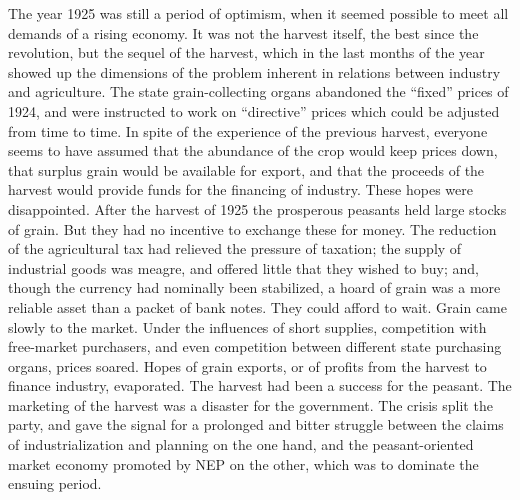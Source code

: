 The year 1925 was still a period of optimism, when it seemed possible to meet all demands of a rising economy. It was not the harvest itself, the best since the revolution, but the sequel of the harvest, which in the last months of the year showed up the dimensions of the problem inherent in relations between industry and agriculture. The state grain-collecting organs abandoned the ``fixed'' prices of 1924, and were instructed to work on ``directive'' prices which could be adjusted from time to time. In spite of the experience of the previous harvest, everyone seems to have assumed that the abundance of the crop would keep prices down, that surplus grain would be available for export, and that the proceeds of the harvest would provide funds for the financing of industry. These hopes were disappointed. After the harvest of 1925 the prosperous peasants held large stocks of grain. But they had no incentive to exchange these for money. The reduction of the agricultural tax had relieved the pressure of taxation; the supply of industrial goods was meagre, and offered little that they wished to buy; and, though the currency had nominally been stabilized, a hoard of grain was a more reliable asset than a packet of bank notes. They could afford to wait. Grain came slowly to the market. Under the influences of short supplies, competition with free-market purchasers, and even competition between different state purchasing organs, prices soared. Hopes of grain exports, or of profits from the harvest to finance industry, evaporated. The harvest had been a success for the peasant. The marketing of the harvest was a disaster for the government. The crisis split the party, and gave the signal for a prolonged and bitter struggle between the claims of industrialization and planning on the one hand, and the peasant-oriented market economy promoted by NEP on the other, which was to dominate the ensuing period. 


